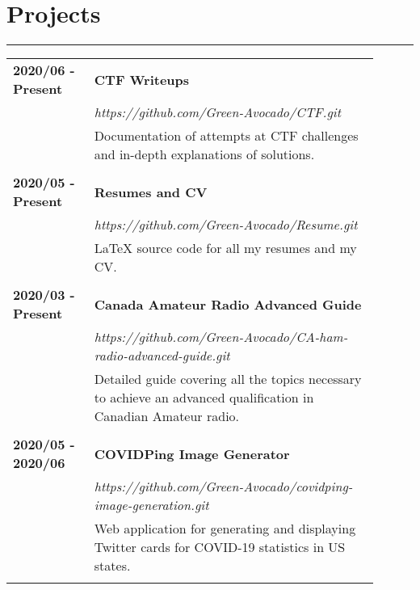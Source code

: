 \documentclass[letterpaper]{article}
\newcommand{\horizontalLine}{%
    \rule{\linewidth}{0.2pt}
    \vspace{1ex}
}
\begin{document}
    \section*{Projects}

        \horizontalLine

        \begin{tabular}{p{0.2\linewidth} p{0.7\linewidth}} 
            \textbf{2020/06 - Present} & \large\textbf{CTF Writeups} \\
            & \emph{https://github.com/Green-Avocado/CTF.git} \\
            & Documentation of attempts at CTF challenges and in-depth explanations of solutions. \\
            \\
            \textbf{2020/05 - Present} & \large\textbf{Resumes and CV} \\
            & \emph{https://github.com/Green-Avocado/Resume.git} \\
            & LaTeX source code for all my resumes and my CV. \\
            \\
            \textbf{2020/03 - Present} & \large\textbf{Canada Amateur Radio Advanced Guide} \\
            & \emph{https://github.com/Green-Avocado/CA-ham-radio-advanced-guide.git} \\
            & Detailed guide covering all the topics necessary to achieve an advanced qualification in Canadian Amateur radio. \\
            \\
            \textbf{2020/05 - 2020/06} & \large\textbf{COVIDPing Image Generator} \\
            & \emph{https://github.com/Green-Avocado/covidping-image-generation.git} \\
            & Web application for generating and displaying Twitter cards for COVID-19 statistics in US states. \\
            \\
        \end{tabular}
\end{document}
